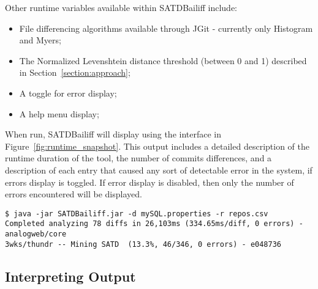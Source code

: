 \documentclass[3p]{elsarticle}
\newcommand{\approach}{SATDBailiff\xspace}
\begin{document}
Other runtime variables available within \approach include: 
\begin{itemize}
    \item File differencing algorithms available through JGit - currently only Histogram and Myers;
    \item The Normalized Levenshtein distance threshold (between 0 and 1) described in Section~\ref{section:approach};
    \item A toggle for error display;
    \item A help menu display;
\end{itemize}

When run, \approach will display using the interface in Figure~\ref{fig:runtime_snapshot}. This output includes a detailed description of the runtime duration of the tool, the number of commits differences, and a description of each entry that caused any sort of detectable error in the system, if errors display is toggled. If error display is disabled, then only the number of errors encountered will be displayed.

\begin{figure*}
    \centering
        \begin{small}
            \begin{verbatim}
$ java -jar SATDBailiff.jar -d mySQL.properties -r repos.csv
Completed analyzing 78 diffs in 26,103ms (334.65ms/diff, 0 errors) - analogweb/core
3wks/thundr -- Mining SATD  (13.3%, 46/346, 0 errors) - e048736
            \end{verbatim}
        \end{small}
        
    \caption{Sample runtime snapshot}
    \label{fig:runtime_snapshot}
\end{figure*}



\subsection{Interpreting Output}
\end{document}
